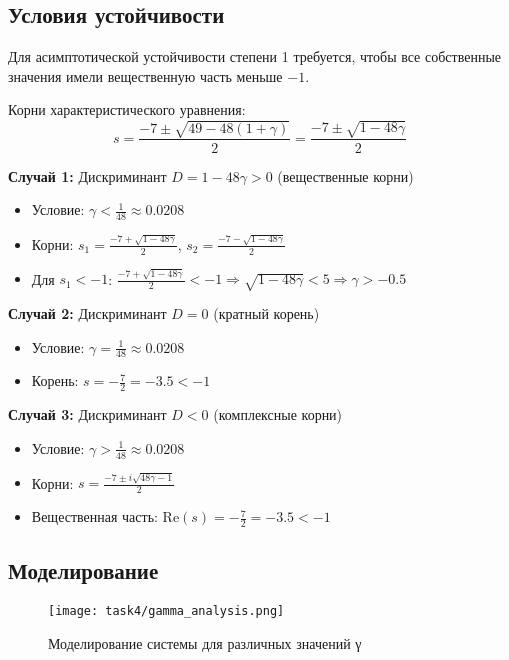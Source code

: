 \subsection*{Условия устойчивости}

Для асимптотической устойчивости степени 1 требуется, чтобы все собственные значения имели вещественную часть меньше $-1$.

Корни характеристического уравнения:
\begin{equation}
s = \frac{-7 \pm \sqrt{49 - 48(1+\gamma)}}{2} = \frac{-7 \pm \sqrt{1-48\gamma}}{2}
\end{equation}

\textbf{Случай 1:} Дискриминант $D = 1 - 48\gamma > 0$ (вещественные корни)
\begin{itemize}
\item Условие: $\gamma < \frac{1}{48} \approx 0.0208$
\item Корни: $s_1 = \frac{-7 + \sqrt{1-48\gamma}}{2}$, $s_2 = \frac{-7 - \sqrt{1-48\gamma}}{2}$
\item Для $s_1 < -1$: $\frac{-7 + \sqrt{1-48\gamma}}{2} < -1 \Rightarrow \sqrt{1-48\gamma} < 5 \Rightarrow \gamma > -0.5$
\end{itemize}

\textbf{Случай 2:} Дискриминант $D = 0$ (кратный корень)
\begin{itemize}
\item Условие: $\gamma = \frac{1}{48} \approx 0.0208$
\item Корень: $s = -\frac{7}{2} = -3.5 < -1$
\end{itemize}

\textbf{Случай 3:} Дискриминант $D < 0$ (комплексные корни)
\begin{itemize}
\item Условие: $\gamma > \frac{1}{48} \approx 0.0208$
\item Корни: $s = \frac{-7 \pm i\sqrt{48\gamma-1}}{2}$
\item Вещественная часть: $\text{Re}(s) = -\frac{7}{2} = -3.5 < -1$
\end{itemize}

\subsection*{Моделирование}

\begin{figure}[H]
\centering
\texttt{[image: task4/gamma\_analysis.png]}
\caption{Моделирование системы для различных значений γ}
\label{fig:gamma_analysis}
\end{figure}


